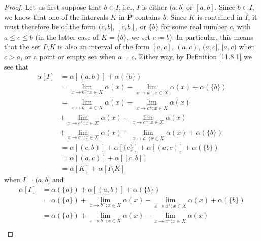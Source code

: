 \begin{proof}
            Let us first suppose that \(b \in I\), i.e., \(I\) is either \((a, b]\) or \([a, b]\).
    Since \(b \in I\), we know that one of the intervals \(K\) in \(\mathbf{P}\) contains \(b\).
    Since \(K\) is contained in \(I\), it must therefore be of the form \((c, b]\), \([c, b]\), or \(\{b\}\) for some real number \(c\), with \(a \leq c \leq b\) (in the latter case of \(K = \{b\}\), we set \(c \coloneqq b\)).
    In particular, this means that the set \(I \setminus K\) is also an interval of the form \([a, c]\), \((a, c)\), \((a, c]\), \([a, c)\) when \(c > a\), or a point or empty set when \(a = c\).
            Either way, by Definition \ref{11.8.1} we see that
            \begin{align*}
                \alpha[I] & = \alpha[(a, b)] + \alpha(\{b\})                                                              \\
                          & = \lim_{x \to b^- ; x \in X} \alpha(x) - \lim_{x \to a^+ ; x \in X} \alpha(x) + \alpha(\{b\}) \\
                          & = \lim_{x \to b^- ; x \in X} \alpha(x) - \lim_{x \to c^+ ; x \in X} \alpha(x)                 \\
                          & + \lim_{x \to c^+ ; x \in X} \alpha(x) - \lim_{x \to c^- ; x \in X} \alpha(x)                 \\
                          & + \lim_{x \to c^- ; x \in X} \alpha(x) - \lim_{x \to a^+ ; x \in X} \alpha(x) + \alpha(\{b\}) \\
                          & = \alpha[(c, b)] + \alpha[\{c\}] + \alpha[(a, c)] + \alpha(\{b\})                             \\
                          & = \alpha[(a, c)] + \alpha[[c, b]]                                                             \\
                          & = \alpha[K] + \alpha[I \setminus K]
            \end{align*}
            when \(I = (a, b]\) and
    \begin{align*}
        \alpha[I] & = \alpha(\{a\}) + \alpha[(a, b)] + \alpha(\{b\})                                                              \\
                  & = \alpha(\{a\}) + \lim_{x \to b^- ; x \in X} \alpha(x) - \lim_{x \to a^+ ; x \in X} \alpha(x) + \alpha(\{b\}) \\
                  & = \alpha(\{a\}) + \lim_{x \to b^- ; x \in X} \alpha(x) - \lim_{x \to c^+ ; x \in X} \alpha(x)                 \\

\end{align*}
\end{proof}
